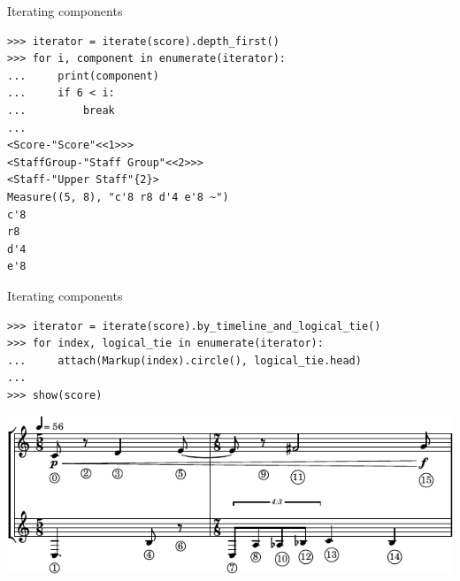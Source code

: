 \begin{frame}[fragile]{Iterating components}

\begin{abjadbookoutput}
\begin{singlespacing}
\vspace{-0.5\baselineskip}
\begin{verbatim}
>>> iterator = iterate(score).depth_first()
>>> for i, component in enumerate(iterator):
...     print(component)
...     if 6 < i:
...         break
...
<Score-"Score"<<1>>>
<StaffGroup-"Staff Group"<<2>>>
<Staff-"Upper Staff"{2}>
Measure((5, 8), "c'8 r8 d'4 e'8 ~")
c'8
r8
d'4
e'8
\end{verbatim}
\end{singlespacing}
\end{abjadbookoutput}

\end{frame}

\begin{frame}[fragile]{Iterating components}

\begin{abjadbookoutput}
\begin{singlespacing}
\vspace{-0.5\baselineskip}
\begin{verbatim}
>>> iterator = iterate(score).by_timeline_and_logical_tie()
>>> for index, logical_tie in enumerate(iterator):
...     attach(Markup(index).circle(), logical_tie.head)
...
>>> show(score)
\end{verbatim}
\noindent\includegraphics[max width=\textwidth,]{assets/lilypond-e9e234b6cc72814df926851d4e073617.pdf}
\end{singlespacing}
\end{abjadbookoutput}

\end{frame}

